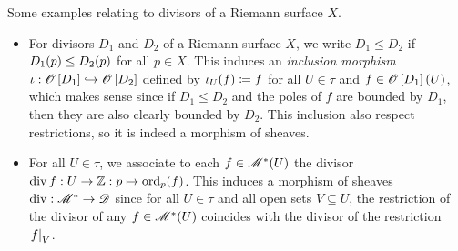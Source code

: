 \documentclass[../Moduli_Spaces_of_Riemann_Surfaces.tex]{subfiles}
\begin{document}
    \begin{example}
        Some examples relating to divisors of a Riemann surface $X$.
        \begin{itemize}
            \item For divisors $D_1$ and $D_2$ of a Riemann surface $X$, we write $D_1\leq D_2$ if $D_1\!\left(p\right)\leq D_2\!\left(p\right)$ for all $p\in X$. This induces an \textit{inclusion morphism} $\iota:\mathscr{O}\left[D_1\right]\hookrightarrow\mathscr{O}\left[D_2\right]$ defined by $\iota_U\!\left(f\right)\coloneqq f$ for all $U\in\tau$ and $f\in\mathscr{O}\left[D_1\right]\left(U\right)$, which makes sense since if $D_1\leq D_2$ and the poles of $f$ are bounded by $D_1$, then they are also clearly bounded by $D_2$. This inclusion also respect restrictions, so it is indeed a morphism of sheaves.
            \item For all $U\in\tau$, we associate to each $f\in\mathscr{M}^\ast\!\left(U\right)$ the divisor $\operatorname{div} f:U\to\mathbb{Z}:p\mapsto\operatorname{ord}_p\!\left(f\right)$. This induces a morphism of sheaves $\operatorname{div}:\mathscr{M}^\ast\to\mathscr{D}$ since for all $U\in\tau$ and all open sets $V\subseteq U$, the restriction of the divisor of any $f\in\mathscr{M}^\ast\!\left(U\right)$ coincides with the divisor of the restriction $\left.f\right|_V$.\exqed
        \end{itemize}
    \end{example}
\end{document}
